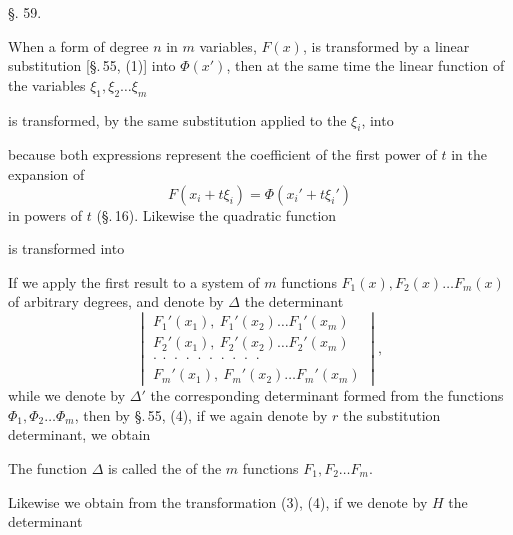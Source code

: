 
\begin{center}
§. 59.

\end{center}

When a form of degree $n$ in $m$ variables, $F(x)$, is transformed by a linear substitution [\S.\,55, (1)] into $\Phi(x')$, then at the same time the linear function of the variables $\xi_1, \xi_2 \ldots \xi_m$


is transformed, by the same substitution applied to the $\xi_i$, into


because both expressions represent the coefficient of the first power of $t$ in the expansion of
\[
F(x_i + t\xi_i) = \Phi(x_i' + t\xi_i')
\]
in powers of $t$ (\S.\,16). Likewise the quadratic function


is transformed into


If we apply the first result to a system of $m$ functions $F_1(x), F_2(x) \ldots F_m(x)$ of arbitrary degrees, and denote by $\varDelta$ the determinant
\[
\begin{vmatrix}
F_1'(x_1),\ F_1'(x_2) \ldots F_1'(x_m) \\
F_2'(x_1),\ F_2'(x_2) \ldots F_2'(x_m) \\
\cdot\ \cdot\ \cdot\ \cdot\ \cdot\ \cdot\ \cdot\ \cdot\ \cdot\ \cdot \\
F_m'(x_1),\ F_m'(x_2) \ldots F_m'(x_m)
\end{vmatrix}\! ,
\]
while we denote by $\varDelta'$ the corresponding determinant formed from the functions $\Phi_1, \Phi_2 \ldots \Phi_m$, then by \S.\,55, (4), if we again denote by $r$ the substitution determinant, we obtain


The function $\varDelta$ is called the  of the $m$ functions $F_1, F_2 \ldots F_m$.

Likewise we obtain from the transformation (3), (4), if we denote by $H$ the determinant
